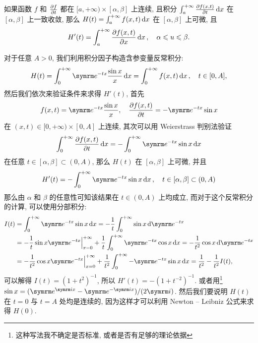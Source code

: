 \begin{exercise}[series=exer]
\begin{answer}
      如果函数 $ f $ 和 $ \pdv{f}{t} $ 都在 $ [a, +\infty) \times [\alpha, \beta] $ 上连续, 且积分 $ \int_{a}^{+\infty} \pdv{f(x, t)}{t} \dx* $ 在 $ [\alpha, \beta] $ 上一致收敛, 那么 $ H(t) = \int_{a}^{+\infty}f(x, t)\dx* $ 在 $ [\alpha, \beta] $ 上可微, 且
      \begin{align*}
          H'(t) = \int_{a}^{+\infty}\pdv{f(x, t)}{x}\dx*,\quad \alpha \le u \le \beta.
      \end{align*}

      对于任意 $ A > 0 $, 我们利用积分因子构造含参变量反常积分:
      \begin{align*}
          H(t) = \int_{0}^{+\infty} \me^{-tx}\frac{\sin x}{x} \dx* = \int_{0}^{+\infty} f(x, t) \dx*,\quad t \in [0, A],
      \end{align*}
      然后我们依次来验证条件来求得 $ H'(t) $, 首先
      \begin{align*}
          f(x, t) = \me^{-tx}\frac{\sin x}{x}, \quad \pdv{f(x, t)}{t} = -\me^{-tx}\sin x
      \end{align*}
      在 $ (x, t) \in [0, +\infty)\times [0, A] $ 上连续, 其次可以用 Weierstrass 判别法验证
      \begin{align*}
          \int_{0}^{+\infty} \pdv{f(x, t)}{t} \dx* = - \int_{0}^{+\infty} \me^{-tx}\sin x \dx*
      \end{align*}
      在任意 $ t \in [\alpha, \beta] \subset (0, A) $, 那么 $ H(t) $ 在 $ [\alpha, \beta] $ 上可微, 并且
      \begin{align*}
          H'(t) = - \int_{0}^{+\infty} \me^{-tx}\sin x \dx*, \quad t \in [\alpha, \beta] \subset (0, A)
      \end{align*}
      那么由 $ \alpha $ 和 $ \beta $ 的任意性可知该结果在 $ t\in (0, A) $ 上均成立, 而对于这个反常积分的计算, 可以使用分部积分:
      \begin{align*}
          I(t) & = \int_{0}^{+\infty} \me^{-tx}\sin x \dx* = -\frac{1}{t}\int_{0}^{+\infty} \sin x\dd{\me^{-tx}}\\
          & = -\frac{1}{t}\sin x\me^{-tx}\Big|_{x = 0}^{+\infty} + \frac{1}{t} \int_{0}^{+\infty} \me^{-tx}\cos x \dx* = -\frac{1}{t^{2}} \cos x\dd{\me^{-tx}}\\
          & = -\frac{1}{t^{2}}\cos x\me^{-tx}\Big|_{x = 0}^{+\infty} + \frac{1}{t^{2}}\int_{0}^{+\infty} -\me^{-tx}\sin x \dx* = \frac{1}{t^{2}} - \frac{1}{t^{2}} I(t),
      \end{align*}
      可以解得 $ I(t) = (1 + t^{2})^{-1} $, 所以 $ H'(t) = -(1 + t^{-2})^{-1} $. 或者用\footnote{这种写法我不确定是否标准, 或者是否有足够的理论依据} $ \sin x = (\me^{\mi x} - \me^{-\mi x})/(2\mi) $. 然后我们要说明 $ H(t) $ 在 $ t = 0 $ 与 $ t = A $ 处均是连续的, 因为这样才可以利用 Newton -- Leibniz 公式来求得 $ H(0) $.


\end{answer}
\end{exercise}
